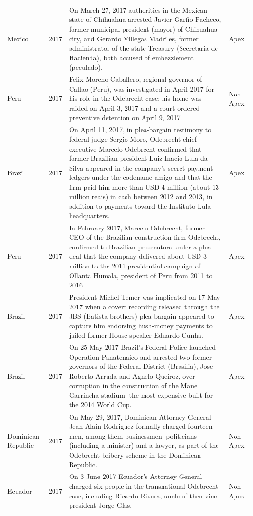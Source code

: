 \begin{landscape}
\begin{longtable}{@{}l c p{15.5cm} l@{}}
Mexico & 2017 & On March 27, 2017 authorities in the Mexican state of Chihuahua arrested Javier Garfio Pacheco, former municipal president (mayor) of Chihuahua city, and Gerardo Villegas Madriles, former administrator of the state Treasury (Secretaria de Hacienda), both accused of embezzlement (peculado). & Apex \\
Peru & 2017 & Felix Moreno Caballero, regional governor of Callao (Peru), was investigated in April 2017 for his role in the Odebrecht case; his home was raided on April 3, 2017 and a court ordered preventive detention on April 9, 2017. & Non-Apex \\
Brazil & 2017 & On April 11, 2017, in plea-bargain testimony to federal judge Sergio Moro, Odebrecht chief executive Marcelo Odebrecht confirmed that former Brazilian president Luiz Inacio Lula da Silva appeared in the company's secret payment ledgers under the codename amigo and that the firm paid him more than USD 4 million (about 13 million reais) in cash between 2012 and 2013, in addition to payments toward the Instituto Lula headquarters. & Apex \\
Peru & 2017 & In February 2017, Marcelo Odebrecht, former CEO of the Brazilian construction firm Odebrecht, confirmed to Brazilian prosecutors under a plea deal that the company delivered about USD 3 million to the 2011 presidential campaign of Ollanta Humala, president of Peru from 2011 to 2016. & Apex \\
Brazil & 2017 & President Michel Temer was implicated on 17 May 2017 when a covert recording released through the JBS (Batista brothers) plea bargain appeared to capture him endorsing hush-money payments to jailed former House speaker Eduardo Cunha. & Apex \\
Brazil & 2017 & On 25 May 2017 Brazil's Federal Police launched Operation Panatenaico and arrested two former governors of the Federal District (Brasilia), Jose Roberto Arruda and Agnelo Queiroz, over corruption in the construction of the Mane Garrincha stadium, the most expensive built for the 2014 World Cup. & Apex \\
Dominican Republic & 2017 & On May 29, 2017, Dominican Attorney General Jean Alain Rodriguez formally charged fourteen men, among them businessmen, politicians (including a minister) and a lawyer, as part of the Odebrecht bribery scheme in the Dominican Republic. & Non-Apex \\
Ecuador & 2017 & On 3 June 2017 Ecuador's Attorney General charged six people in the transnational Odebrecht case, including Ricardo Rivera, uncle of then vice-president Jorge Glas. & Non-Apex \\

\end{longtable}
\end{landscape}
